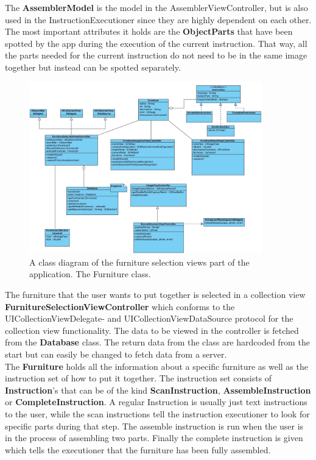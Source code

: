 The \textbf{AssemblerModel} is the model in the AssemblerViewController, but is also used in the InstructionExecutioner since they are highly dependent on each other.
The most important attributes it holds are the \textbf{ObjectParts} that have been spotted by the 
app during the execution of the current instruction.
That way, all the parts needed for the current instruction do not need to be in the same image 
together but instead can be spotted separately.\\

\begin{figure}[!hbtp]
\begin{center}
\includegraphics[width = 0.9\textwidth]{./Images/FurnitureClassDiagram.jpg}
\caption{A class diagram of the furniture selection views part of the application. The Furniture class.}
\label{fig:classdiagramassembler}
\end{center}
\end{figure}

The furniture that the user wants to put together is selected in a collection view \textbf{FurnitureSelectionViewController}
which conforms to the UICollectionViewDelegate- and UICollectionViewDataSource protocol for the collection view functionality.
The data to be viewed in the controller is fetched from the \textbf{Database} class.
The return data from the class are hardcoded from the start but can easily be changed to fetch
data from a server.\\

The \textbf{Furniture} holds all the information about a specific furniture as well as the instruction set of how to put it together. The instruction set consists of \textbf{Instruction}'s that can be
of the kind \textbf{ScanInstruction}, \textbf{AssembleInstruction} or \textbf{CompleteInstruction}.
A regular Instruction is usually just text instructions to the user, while the scan instructions tell the instruction executioner to look for specific parts during that step.
The assemble instruction is run when the user is in the process of assembling two parts.
Finally the complete instruction is given which tells the executioner that the furniture has been fully assembled.\\

